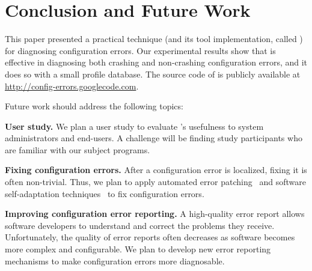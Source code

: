\section{Conclusion and Future Work}
\vspace{-1mm}

This paper presented a practical technique (and
its tool implementation, called \ourtool) for diagnosing
configuration errors.
Our experimental results show that \ourtool is effective in
diagnosing both crashing and non-crashing configuration errors,
and it does so with a small profile database.
The source code of \ourtool is publicly available at
\url{http://config-errors.googlecode.com}.

\smallskip

Future work should address the following topics:

\textbf{User study.} We plan a user study to evaluate
\ourtool's usefulness to system administrators and
end-users. A challenge will be finding study participants
who are familiar with our subject programs.

\textbf{Fixing configuration errors.} After a configuration error
is localized, fixing it is
often non-trivial. Thus, we
plan to apply automated error patching~\cite{rangefix} and
software self-adaptation techniques~\cite{Wang:2009:STR} to
fix configuration errors.


\textbf{Improving configuration error reporting.} A high-quality
error report allows software developers to understand and correct the problems
they receive. 
Unfortunately, the quality of error reports often
decreases as software becomes more complex and configurable.
We plan to develop new error reporting mechanisms
to make configuration errors
more diagnosable.

